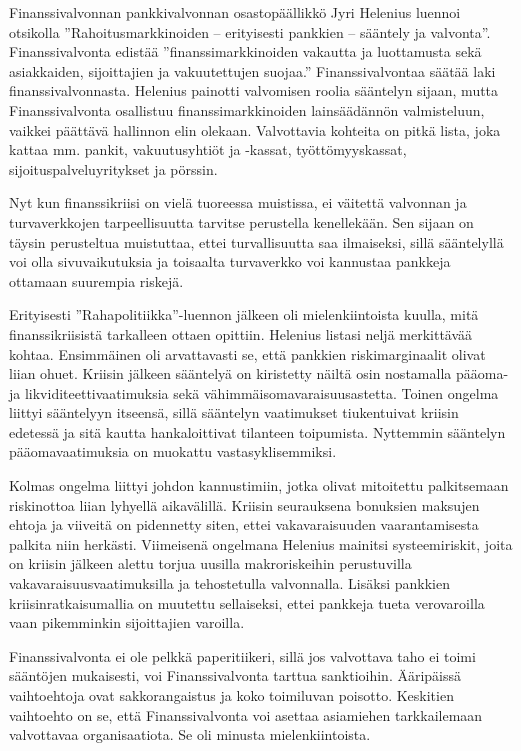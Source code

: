 \documentclass[12pt]{article}
\begin{document}
Finanssivalvonnan pankkivalvonnan osastopäällikkö Jyri Helenius luennoi otsikolla ''Rahoitusmarkkinoiden -- erityisesti pankkien -- sääntely ja valvonta''. Finanssivalvonta edistää ''finanssimarkkinoiden vakautta ja luottamusta sekä asiakkaiden, sijoittajien ja vakuutettujen suojaa.'' Finanssivalvontaa säätää laki finanssivalvonnasta. Helenius painotti valvomisen roolia sääntelyn sijaan, mutta Finanssivalvonta osallistuu finanssimarkkinoiden lainsäädännön valmisteluun, vaikkei päättävä hallinnon elin olekaan. Valvottavia kohteita on pitkä lista, joka kattaa mm. pankit, vakuutusyhtiöt ja -kassat, työttömyyskassat, sijoituspalveluyritykset ja pörssin.

Nyt kun finanssikriisi on vielä tuoreessa muistissa, ei väitettä valvonnan ja turvaverkkojen tarpeellisuutta tarvitse perustella kenellekään. Sen sijaan on täysin perusteltua muistuttaa, ettei turvallisuutta saa ilmaiseksi, sillä sääntelyllä voi olla sivuvaikutuksia ja toisaalta turvaverkko voi kannustaa pankkeja ottamaan suurempia riskejä.

Erityisesti ''Rahapolitiikka''-luennon jälkeen oli mielenkiintoista kuulla, mitä finanssikriisistä tarkalleen ottaen opittiin. Helenius listasi neljä merkittävää kohtaa. Ensimmäinen oli arvattavasti se, että pankkien riskimarginaalit olivat liian ohuet. Kriisin jälkeen sääntelyä on kiristetty näiltä osin nostamalla pääoma- ja likviditeettivaatimuksia sekä vä\-him\-mäis\-oma\-va\-rai\-suus\-as\-tet\-ta. Toinen ongelma liittyi sääntelyyn itseensä, sillä sääntelyn vaatimukset tiukentuivat kriisin edetessä ja sitä kautta hankaloittivat tilanteen toipumista. Nyttemmin sääntelyn pääomavaatimuksia on muokattu vastasyklisemmiksi.

Kolmas ongelma liittyi johdon kannustimiin, jotka olivat mitoitettu palkitsemaan riskinottoa liian lyhyellä aikavälillä. Kriisin seurauksena bonuksien maksujen ehtoja ja viiveitä on pidennetty siten, ettei vakavaraisuuden vaarantamisesta palkita niin herkästi. Viimeisenä ongelmana Helenius mainitsi systeemiriskit, joita on kriisin jälkeen alettu torjua uusilla makroriskeihin perustuvilla vakavaraisuusvaatimuksilla ja tehostetulla valvonnalla. Lisäksi pankkien kriisinratkaisumallia on muutettu sellaiseksi, ettei pankkeja tueta verovaroilla vaan pikemminkin sijoittajien varoilla.

Finanssivalvonta ei ole pelkkä paperitiikeri, sillä jos valvottava taho ei toimi sääntöjen mukaisesti, voi Finanssivalvonta tarttua sanktioihin. Ääripäissä vaihtoehtoja ovat sakkorangaistus ja koko toimiluvan poisotto. Keskitien vaihtoehto on se, että Finanssivalvonta voi asettaa asiamiehen tarkkailemaan valvottavaa organisaatiota. Se oli minusta mielenkiintoista.
\end{document}
